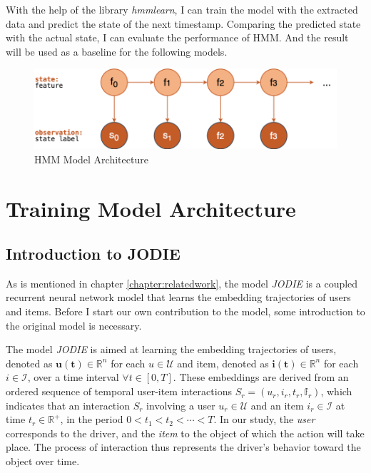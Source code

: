 With the help of the library \textit{hmmlearn}, I can train the model with the extracted data and predict the state of the next timestamp. Comparing the predicted state with the actual state, I can evaluate the performance of HMM. And the result will be used as a baseline for the following models.
\begin{figure}[h]
    \centering
    \includegraphics[width=0.8\linewidth]{figures/04_HMMmodel.png}
    \caption{HMM Model Architecture}
    \label{fig:HMMmodel}
\end{figure}


\section{Training Model Architecture}

\subsection{Introduction to JODIE}
As is mentioned in chapter \ref{chapter:relatedwork}, the model \textit{JODIE} is a coupled recurrent neural network model that learns the embedding trajectories of users and items. Before I start our own contribution to the model, some introduction to the original model is necessary.

The model \textit{JODIE} is aimed at learning the embedding trajectories of users, denoted as $\mathbf{u(t)} \in \mathbb{R} ^n$ for each $u \in \mathcal{U}$ and item, denoted as $\mathbf{i(t)} \in \mathbb{R} ^n$ for each $i \in \mathcal{I} $, over a time interval $\forall t \in [0,T] $. These embeddings are derived from an ordered sequence of temporal user-item interactions $S_r=(u_r,i_r,t_r,\mathbb{f}_r)$, which indicates that an interaction $S_r$ involving a user $u_r \in \mathcal{U} $ and an item $i_r \in \mathcal{I} $ at time $t_r \in \mathbb{R} ^+$, in the period $0 < t_1 < t_2< \cdots  < T$. In our study, the \textit{user} corresponds to the driver, and the \textit{item} to the object of which the action will take place. The process of interaction thus represents the driver’s behavior toward the object over time.

